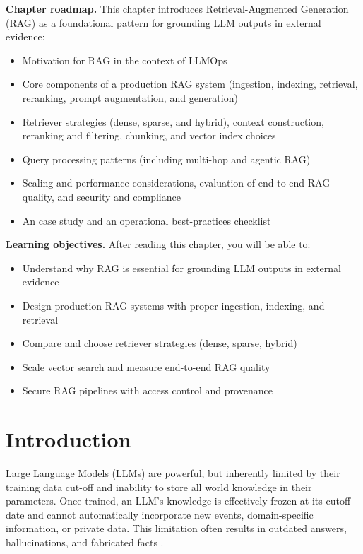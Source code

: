 \begin{tcolorbox}[
  title={\textbf{Chapter Overview}},
  colback=blue!5,
  colframe=blue!40!black,
  colbacktitle=blue!20,
  coltitle=black,
  fonttitle=\bfseries,
  boxrule=0.7pt,
  arc=4pt,
  left=5mm, right=5mm, top=4mm, bottom=4mm
]
\noindent\textbf{Chapter roadmap.}
This chapter introduces Retrieval-Augmented Generation (RAG) as a foundational pattern for grounding LLM outputs in external evidence:
\begin{itemize}[leftmargin=1.5em, itemsep=3pt]
    \item Motivation for RAG in the context of LLMOps
    \item Core components of a production RAG system (ingestion, indexing, retrieval, reranking, prompt augmentation, and generation)
    \item Retriever strategies (dense, sparse, and hybrid), context construction, reranking and filtering, chunking, and vector index choices
    \item Query processing patterns (including multi-hop and agentic RAG)
    \item Scaling and performance considerations, evaluation of end-to-end RAG quality, and security and compliance
    \item An \ishtar{} case study and an operational best-practices checklist
\end{itemize}

\medskip
\noindent\textbf{Learning objectives.} After reading this chapter, you will be able to:
\begin{itemize}[leftmargin=1.5em, itemsep=3pt]
    \item Understand why RAG is essential for grounding LLM outputs in external evidence
    \item Design production RAG systems with proper ingestion, indexing, and retrieval
    \item Compare and choose retriever strategies (dense, sparse, hybrid)
    \item Scale vector search and measure end-to-end RAG quality
    \item Secure RAG pipelines with access control and provenance
\end{itemize}
\end{tcolorbox}

\section{Introduction}
\label{sec:ch8-introduction}
Large Language Models (LLMs) are powerful, but inherently limited by their training data cut-off and inability to store all world knowledge in their parameters. Once trained, an LLM's knowledge is effectively frozen at its cutoff date and cannot automatically incorporate new events, domain-specific information, or private data. This limitation often results in outdated answers, hallucinations, and fabricated facts \cite{Lewis2020RAG,Pinecone2023RAG}. 

